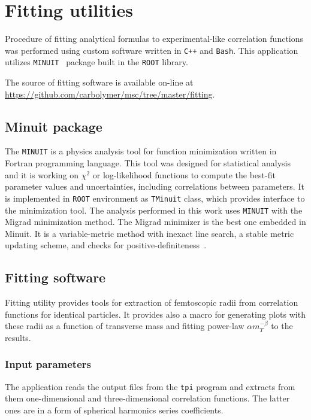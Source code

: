 %
\chapter{Fitting utilities}
\label{a:b}
  Procedure of fitting analytical formulas to experimental-like correlation functions was performed using custom software written in \verb|C++| and \verb|Bash|.
  This application utilizes \verb|MINUIT|~\cite{minuit} package built in the \verb|ROOT| library.

  The source of fitting software is available on-line at \url{https://github.com/carbolymer/msc/tree/master/fitting}.
  \section{Minuit package}
    The \verb|MINUIT| is a physics analysis tool for function minimization written in Fortran programming language.
    This tool was designed for statistical analysis and it is working on $\chi^2$ or log-likelihood functions to compute the best-fit parameter values and uncertainties, including correlations between parameters.
    It is implemented in \verb|ROOT| environment as \verb|TMinuit| class, which provides interface to the minimization tool.
    The analysis performed in this work uses \verb|MINUIT| with the Migrad minimization method.
    The Migrad minimizer is the best one embedded in Minuit.
    It is a variable-metric method with inexact line search, a stable metric updating scheme, and checks for positive-definiteness~\cite{minuit}.
  \section{Fitting software}
    Fitting utility provides tools for extraction of femtoscopic radii from correlation functions for identical particles.
    It provides also a macro for generating plots with these radii as a function of transverse mass and fitting power-law $\alpha m_T^{-\beta}$ to the results.
    \subsection{Input parameters}
      The application reads the output files from the \verb|tpi| program and extracts from them one-dimensional and three-dimensional correlation functions.
      The latter ones are in a form of spherical harmonics series coefficients.

